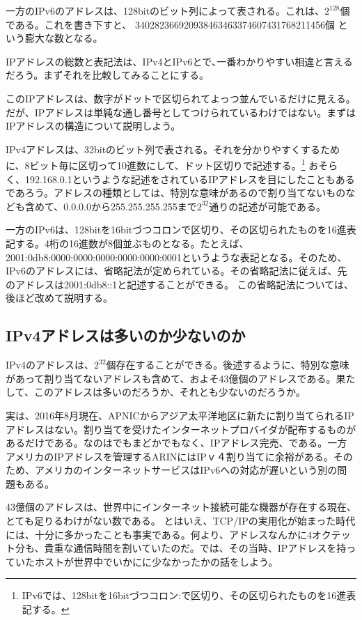 一方のIPv6のアドレスは、128bitのビット列によって表される。これは、$2^{128}$個である。これを書き下すと、
340282366920938463463374607431768211456個
という膨大な数となる。

IPアドレスの総数と表記法は、IPv4とIPv6とで､一番わかりやすい相違と言えるだろう。まずそれを比較してみることにする。

このIPアドレスは、数字がドットで区切られてよっつ並んでいるだけに見える。だが、IPアドレスは単純な通し番号としてつけられているわけではない。まずはIPアドレスの構造について説明しよう。

IPv4アドレスは、32bitのビット列で表される。それを分かりやすくするために、8ビット毎に区切って10進数にして、ドット区切りで記述する。\footnote{IPv6では、128bitを16bitづつコロン:で区切り、その区切られたものを16進表記する。} おそらく、192.168.0.1というような記述をされているIPアドレスを目にしたこともあるであろう。アドレスの種類としては、特別な意味があるので割り当てないものなども含めて、0.0.0.0から255.255.255.255まで$2^{32}$通りの記述が可能である。

一方のIPv6は、128bitを16bitづつコロンで区切り、その区切られたものを16進表記する。4桁の16進数が8個並ぶものとなる。たとえば、2001:0db8:0000:0000:0000:0000:0000:0001というような表記となる。そのため、IPv6のアドレスには、省略記法が定められている。その省略記法に従えば、先のアドレスは2001:0db8::1と記述することができる。
この省略記法については、後ほど改めて説明する。



\subsection{IPv4アドレスは多いのか少ないのか}
IPv4のアドレスは、$2^{32}$個存在することができる。後述するように、特別な意味があって割り当てないアドレスも含めて、およそ43億個のアドレスである。果たして、このアドレスは多いのだろうか、それとも少ないのだろうか。

実は、2016年8月現在、APNICからアジア太平洋地区に新たに割り当てられるIPアドレスはない。割り当てを受けたインターネットプロバイダが配布するものがあるだけである。なのはでもまどかでもなく、IPアドレス完売、である。一方アメリカのIPアドレスを管理するARINにはIPｖ４割り当てに余裕がある。そのため、アメリカのインターネットサービスはIPv6への対応が遅いという別の問題もある。

43億個のアドレスは、世界中にインターネット接続可能な機器が存在する現在、とても足りるわけがない数である。
とはいえ、TCP/IPの実用化が始まった時代には、十分に多かったことも事実である。何より、アドレスなんかに4オクテット分も、貴重な通信時間を割いていたのだ。では、その当時、IPアドレスを持っていたホストが世界中でいかにに少なかったかの話をしよう。

